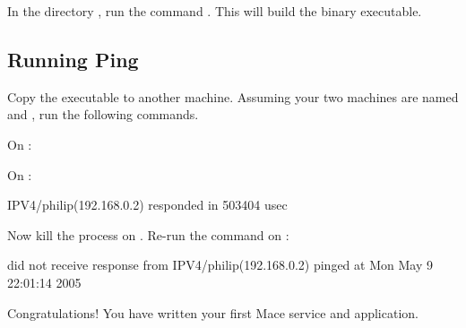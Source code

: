 

In the directory , run the command
.  This will build the binary  executable.


\subsection{Running Ping}
\label{sec:running-ping}

Copy the  executable to another machine.  Assuming your
two machines are named  and , run the
following commands.

\noindent
On :

\begin{screen}
\end{screen}

\noindent
On :

\begin{screen}
IPV4/philip(192.168.0.2) responded in 503404 usec
\end{screen}

\noindent
Now kill the  process on .  Re-run
the command on :

\small
\begin{screen}
did not receive response from IPV4/philip(192.168.0.2) pinged at Mon May  9 22:01:14 2005
\end{screen}
\normalsize

\noindent
Congratulations!  You have written your first Mace service and
application.

